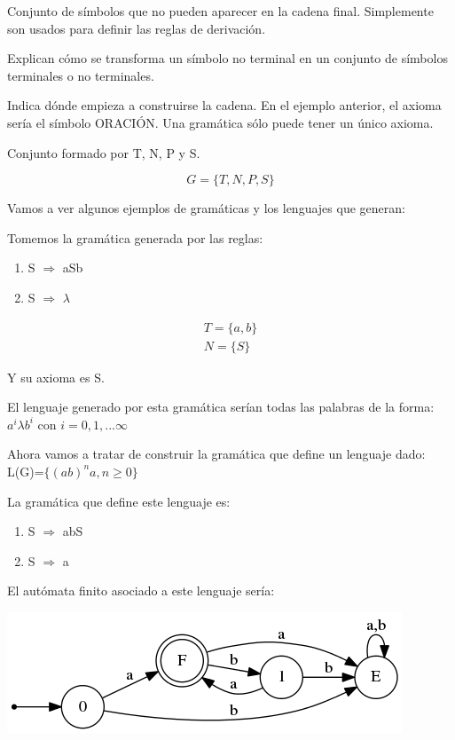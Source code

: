 \documentclass{apuntes}
\begin{document}
\begin{defn}
Conjunto de símbolos que no pueden aparecer en la cadena final. Simplemente son usados para definir las reglas de derivación.
\end{defn}

\begin{defn}
Explican cómo se transforma un símbolo no terminal en un conjunto de símbolos terminales o no terminales.
\end{defn}

\begin{defn}
Indica dónde empieza a construirse la cadena. En el ejemplo anterior, el axioma sería el símbolo ORACIÓN. Una gramática sólo puede tener un único axioma.
\end{defn}

\begin{defn}[Gramática (G)]
Conjunto formado por T, N, P y S.

\[ G = \lbrace T, N, P, S \rbrace \]
\end{defn}


Vamos a ver algunos ejemplos de gramáticas y los lenguajes que generan:
\begin{example}
Tomemos la gramática generada por las reglas:
\begin{enumerate}
\item S $\Rightarrow$ aSb
\item S $\Rightarrow$ $\lambda$
\end{enumerate}

\begin{gather*}
T = \lbrace a, b \rbrace \\
N = \lbrace S \rbrace
\end{gather*}

Y su axioma es S.

El lenguaje generado por esta gramática serían todas las palabras de la forma: $a^i\lambda b^i$ con $ i=0,1,... \infty$
\end{example}

\begin{example}
Ahora vamos a tratar de construir la gramática que define un lenguaje dado:
L(G)=$\lbrace (ab)^na, n \geq 0 \rbrace$

La gramática que define este lenguaje es:
\begin{enumerate}
\item S $\Rightarrow$ abS
\item S $\Rightarrow$ a
\end{enumerate}

El autómata finito asociado a este lenguaje sería:
\begin{center}
\includegraphics[scale=0.75]{automata1.png}
\end{center}
\end{example}
\end{document}
